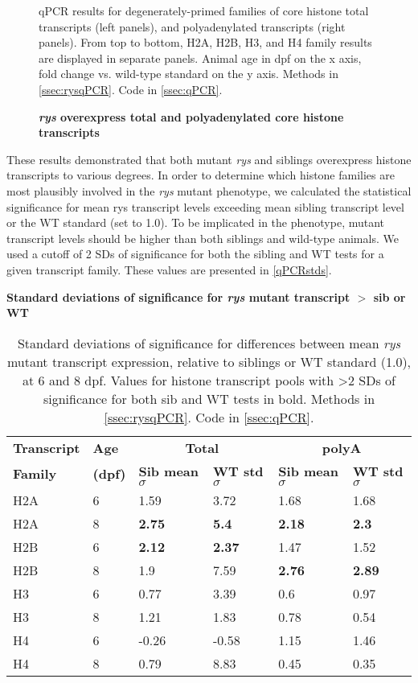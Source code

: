 \begin{figure}[!h]
    \caption{{\bf \textit{rys} overexpress total and polyadenylated core histone transcripts}}
    qPCR results for degenerately-primed families of core histone total transcripts (left panels), and polyadenylated transcripts (right panels). From top to bottom, H2A, H2B, H3, and H4 family results are displayed in separate panels. Animal age in dpf on the x axis, fold change vs. wild-type standard on the y axis.    
    \label{histonertpcr}
    Methods in \autoref{ssec:rysqPCR}.
    Code in \autoref{ssec:qPCR}.
\end{figure}

These results demonstrated that both mutant \textit{rys} and siblings overexpress histone transcripts to various degrees. In order to determine which histone families are most plausibly involved in the \textit{rys} mutant phenotype, we calculated the statistical significance for mean rys transcript levels exceeding mean sibling transcript level or the WT standard (set to 1.0). To be implicated in the phenotype, mutant transcript levels should be higher than both siblings and wild-type animals. We used a cutoff of 2 SDs of significance for both the sibling and WT tests for a given transcript family. These values are presented in \autoref{qPCRstds}.

\begin{table}[!ht]
    \centering
    \caption{{\bf Standard deviations of significance for \textit{rys} mutant transcript $>$ sib or WT}}
    \begin{tabular}{|l|l|l|l|l|l|} 
        \hline {\bf Transcript} & {\bf Age} & \multicolumn{2}{c|}{\bf{Total}} & \multicolumn{2}{c|}{\bf{polyA}}\\ \cline{3-6}
        {\bf Family} & {\bf (dpf)} & {\bf Sib mean $\sigma$} & {\bf WT std $\sigma$} & {\bf Sib mean $\sigma$} & {\bf WT std $\sigma$}\\ \hline 
        H2A & 6 & 1.59 & 3.72 & 1.68 & 1.68\\ \hline
        H2A & 8 & {\bf 2.75} & {\bf 5.4} & {\bf 2.18} & {\bf 2.3}\\ \hline
        H2B & 6 & {\bf 2.12} & {\bf 2.37} & 1.47 & 1.52\\ \hline
        H2B & 8 & 1.9 & 7.59 & {\bf 2.76} & {\bf 2.89}\\ \hline
        H3 & 6 & 0.77 & 3.39 & 0.6 & 0.97\\ \hline
        H3 & 8 & 1.21 & 1.83 & 0.78 & 0.54\\ \hline
        H4 & 6 & -0.26 & -0.58 & 1.15 & 1.46\\ \hline
        H4 & 8 & 0.79 & 8.83 & 0.45 & 0.35\\ \hline
    \end{tabular}
    \caption{    \label{qPCRstds}
    Standard deviations of significance for differences between mean \textit{rys} mutant transcript expression, relative to siblings or WT standard (1.0), at 6 and 8 dpf. Values for histone transcript pools with \textgreater2 SDs of significance for both sib and WT tests in bold. 
    Methods in \autoref{ssec:rysqPCR}.
    Code in \autoref{ssec:qPCR}.
    }
\end{table}

